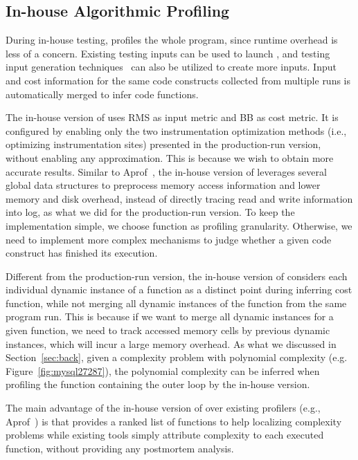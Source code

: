 \subsection{In-house Algorithmic Profiling}
\label{sec:in-house}

During in-house testing, \Tool profiles the whole program, 
since runtime overhead is less of a concern. 
Existing testing inputs can be used to launch \Tool, 
and testing input generation techniques~\cite{KLEE,dart,s2e} 
can also be utilized to create more inputs.
Input and cost information for the same code constructs 
collected from multiple runs
is automatically merged to infer code functions. 

The in-house version of \Tool uses RMS as input metric and BB
as cost metric.
It is configured by enabling
only the two instrumentation optimization methods (i.e.,
optimizing instrumentation sites) presented 
in the production-run version, without enabling any approximation. 
This is because we wish 
to obtain more accurate results.
Similar to Aprof~\cite{Aprof1,Aprof2}, 
the in-house version of \Tool leverages several global data structures
to preprocess memory access information and lower memory and disk overhead,
instead of directly tracing read and write information into log, 
as what we did for the production-run version. 
To keep the implementation simple, 
we choose function as profiling granularity.
Otherwise, we need to implement more complex 
mechanisms to judge whether a given code construct 
has finished its execution.  

Different from the production-run version, the in-house version of \Tool 
considers each individual dynamic instance of a function 
as a distinct point during inferring cost function, 
while not merging all dynamic instances of the function 
from the same program run.
This is because if we want to merge all dynamic instances for a given function, 
we need to track accessed memory cells by previous dynamic instances, 
which will incur a large memory overhead. 
As what we discussed in Section~\ref{sec:back}, 
given a complexity problem with polynomial complexity 
(e.g. Figure~\ref{fig:mysql27287}),  
the polynomial complexity can be inferred when profiling 
the function containing the outer loop by the in-house version.



The main advantage of the in-house version of \Tool 
over existing profilers (e.g., Aprof~\cite{Aprof1,Aprof2}) is that 
\Tool provides a ranked list of functions to
help localizing complexity problems while 
existing tools simply attribute complexity to each executed function, 
without providing any postmortem analysis. 


